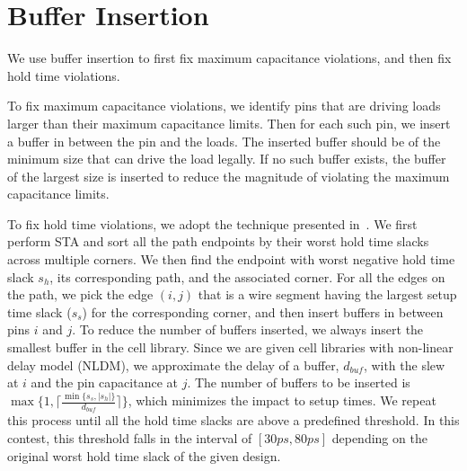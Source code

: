 \section{Buffer Insertion}
\label{sec:buf_insert}
We use buffer insertion to first fix maximum capacitance violations, and then fix hold time violations.

To fix maximum capacitance violations, we identify pins that are driving loads larger than their maximum capacitance limits. Then for each such pin, we insert a buffer in between the pin and the loads. The inserted buffer should be of the minimum size that can drive the load legally. If no such buffer exists, the buffer of the largest size is inserted to reduce the magnitude of violating the maximum capacitance limits.

To fix hold time violations, we adopt the technique presented in~\cite{Shenoy:Minimum}. We first perform STA and sort all the path endpoints by their worst hold time slacks across multiple corners. We then find the endpoint with worst negative hold time slack $s_h$, its corresponding path, and the associated corner. For all the edges on the path, we pick the edge $(i, j)$ that is a wire segment having the largest setup time slack ($s_s$) for the corresponding corner, and then insert buffers in between pins $i$ and $j$. To reduce the number of buffers inserted, we always insert the smallest buffer in the cell library. Since we are given cell libraries with non-linear delay model (NLDM), we approximate the delay of a buffer, $d_{buf}$, with the slew at $i$ and the pin capacitance at $j$. The number of buffers to be inserted is $\max\{1, \lceil\frac{\min\{s_s, |s_h|\}}{d_{buf}}\rceil\}$, which minimizes the impact to setup times. We repeat this process until all the hold time slacks are above a predefined threshold. In this contest, this threshold falls in the interval of $[30ps, 80ps]$ depending on the original worst hold time slack of the given design.





